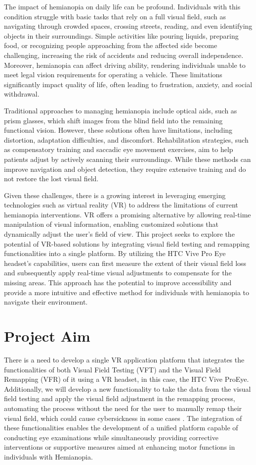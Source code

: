 \documentclass{l4proj}
\begin{document}
The impact of hemianopia on daily life can be profound. Individuals with this condition struggle with basic tasks that rely on a full visual field, such as navigating through crowded spaces, crossing streets, reading, and even identifying objects in their surroundings. Simple activities like pouring liquids, preparing food, or recognizing people approaching from the affected side become challenging, increasing the risk of accidents and reducing overall independence. Moreover, hemianopia can affect driving ability, rendering individuals unable to meet legal vision requirements for operating a vehicle. These limitations significantly impact quality of life, often leading to frustration, anxiety, and social withdrawal.  

Traditional approaches to managing hemianopia include optical aids, such as prism glasses, which shift images from the blind field into the remaining functional vision. However, these solutions often have limitations, including distortion, adaptation difficulties, and discomfort. Rehabilitation strategies, such as compensatory training and saccadic eye movement exercises, aim to help patients adjust by actively scanning their surroundings. While these methods can improve navigation and object detection, they require extensive training and do not restore the lost visual field.  

Given these challenges, there is a growing interest in leveraging emerging technologies such as virtual reality (VR) to address the limitations of current hemianopia interventions. VR offers a promising alternative by allowing real-time manipulation of visual information, enabling customized solutions that dynamically adjust the user's field of view. This project seeks to explore the potential of VR-based solutions by integrating visual field testing and remapping functionalities into a single platform. By utilizing the HTC Vive Pro Eye headset’s capabilities, users can first measure the extent of their visual field loss and subsequently apply real-time visual adjustments to compensate for the missing areas. This approach has the potential to improve accessibility and provide a more intuitive and effective method for individuals with hemianopia to navigate their environment.

\section{Project Aim}
There is a need to develop a single VR application platform that integrates the functionalities of both Visual Field Testing (VFT) and the Visual Field Remapping (VFR) of it using a VR headset, in this case, the HTC Vive ProEye. Additionally, we will develop a new functionality to take the data from the visual field testing and apply the visual field adjustment in the remapping process, automating the process without the need for the user to manually remap their visual field, which could cause cybersickness in some cases \cite{Perri2022CybersicknessStudy}. The integration of these functionalities enables the development of a unified platform capable of conducting eye examinations while simultaneously providing corrective interventions or supportive measures aimed at enhancing motor functions in individuals with Hemianopia.
\end{document}
